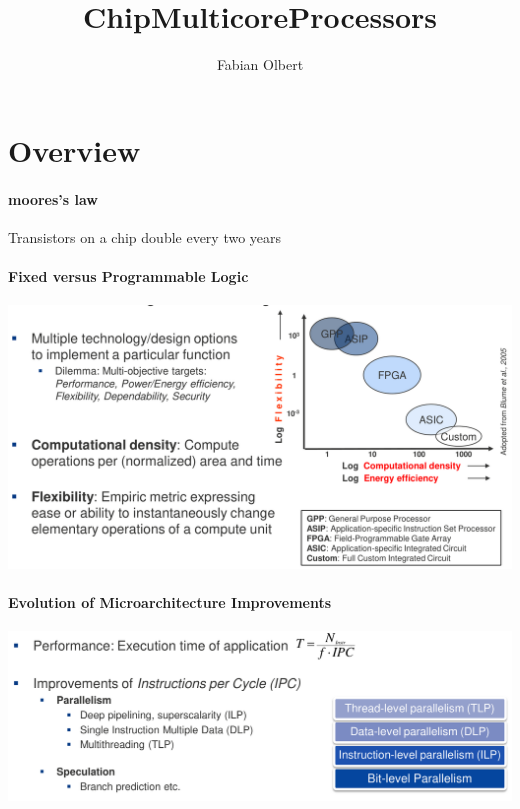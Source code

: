 \documentclass[fontsize=8pt]{scrartcl}
\title{ChipMulticoreProcessors}
\author{Fabian Olbert}                    %
\begin{document}
\setlength{\columnseprule}{0.2pt}
\setlength{\parindent}{0pt}

\begin{multicols*}{4}

  \footnotesize


\noindent
{\Large\scshape\color{catBlue}\inserttitle} %

\section{Overview}

\paragraph{moores's law} Transistors on a chip double every two years

\paragraph{Fixed versus Programmable Logic}

\begin{center}
  \centering
  \includegraphics[width=0.8\linewidth]{img/FixedVsProgrammableLogic.png}
  \label{fig:fixedvsprogrammablelogic}
\end{center}

\paragraph{Evolution of Microarchitecture Improvements}

\begin{center}
  \centering
  \includegraphics[width=0.8\linewidth]{img/EvolutionMicroarchitecture.png}
  \label{fig:evolutionmicroarchitecture}
\end{center}


\end{multicols*}
\end{document}
